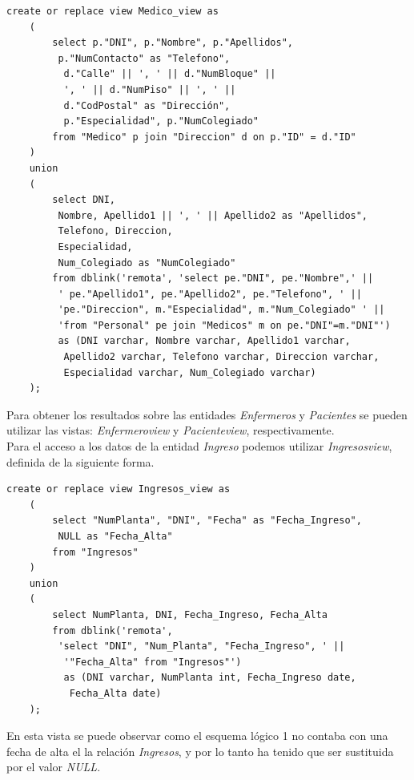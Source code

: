 \documentclass{article}
\begin{document}
\begin{lstlisting}
create or replace view Medico_view as
    (
        select p."DNI", p."Nombre", p."Apellidos",
         p."NumContacto" as "Telefono",
          d."Calle" || ', ' || d."NumBloque" ||
          ', ' || d."NumPiso" || ', ' ||
          d."CodPostal" as "Dirección",
          p."Especialidad", p."NumColegiado"
        from "Medico" p join "Direccion" d on p."ID" = d."ID"
    )
    union
    (
        select DNI,
         Nombre, Apellido1 || ', ' || Apellido2 as "Apellidos",
         Telefono, Direccion,
         Especialidad,
         Num_Colegiado as "NumColegiado"
		from dblink('remota', 'select pe."DNI", pe."Nombre",' ||
		 ' pe."Apellido1", pe."Apellido2", pe."Telefono", ' ||
		 'pe."Direccion", m."Especialidad", m."Num_Colegiado" ' ||
		 'from "Personal" pe join "Medicos" m on pe."DNI"=m."DNI"') 
		 as (DNI varchar, Nombre varchar, Apellido1 varchar,
		  Apellido2 varchar, Telefono varchar, Direccion varchar,
		  Especialidad varchar, Num_Colegiado varchar)
    );
\end{lstlisting}


Para obtener los resultados sobre las entidades \emph{Enfermeros} y \emph{Pacientes} se pueden utilizar las vistas: \emph{Enfermeroview} y \emph{Pacienteview}, respectivamente.\\
Para el acceso a los datos de la entidad \emph{Ingreso} podemos utilizar \emph{Ingresosview}, definida de la siguiente forma.\\

\begin{lstlisting}
create or replace view Ingresos_view as
    (
        select "NumPlanta", "DNI", "Fecha" as "Fecha_Ingreso", 
         NULL as "Fecha_Alta"
        from "Ingresos"
    )
    union
    (
        select NumPlanta, DNI, Fecha_Ingreso, Fecha_Alta
        from dblink('remota', 
         'select "DNI", "Num_Planta", "Fecha_Ingreso", ' || 
          '"Fecha_Alta" from "Ingresos"') 
          as (DNI varchar, NumPlanta int, Fecha_Ingreso date,
           Fecha_Alta date)
    );
\end{lstlisting}

En esta vista se puede observar como el esquema lógico 1 no contaba con una fecha de alta el la relación \emph{Ingresos}, y por lo tanto ha tenido que ser sustituida por el valor \emph{NULL}.

\newpage
\end{document}
